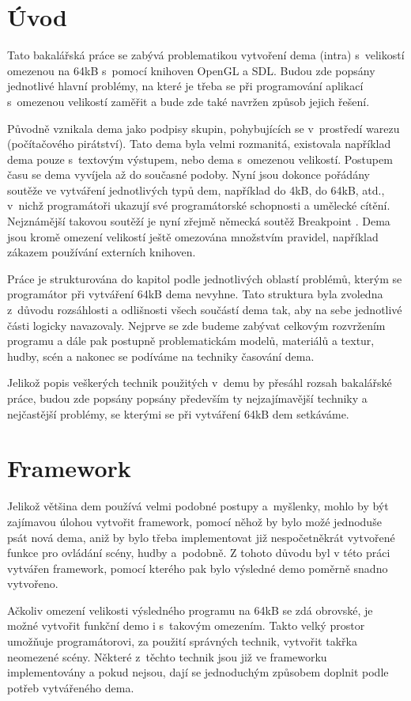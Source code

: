 \chapter{Úvod}
Tato bakalářská práce se zabývá problematikou vytvoření dema (intra) s~velikostí omezenou na 64kB s~pomocí knihoven OpenGL a SDL.
Budou zde popsány jednotlivé hlavní problémy, na které je třeba se při programování aplikací s~omezenou velikostí zaměřit a bude zde také navržen způsob jejich řešení.

Původně vznikala dema jako podpisy skupin, pohybujících se v~prostředí warezu (počítačového pirátství).
Tato dema byla velmi rozmanitá, existovala například dema pouze s~textovým výstupem, nebo dema s~omezenou velikostí.
Postupem času se dema vyvíjela až do současné podoby.
Nyní jsou dokonce pořádány soutěže ve vytváření jednotlivých typů dem, například do 4kB, do 64kB, atd., v~nichž programátoři ukazují své programátorské schopnosti a umělecké cítění.
Nejznámější takovou soutěží je nyní zřejmě německá soutěž Breakpoint \cite{breakpoint}.
Dema jsou kromě omezení velikostí ještě omezována množstvím pravidel, například zákazem používání externích knihoven.

Práce je strukturována do kapitol podle jednotlivých oblastí problémů, kterým se programátor při vytváření 64kB dema nevyhne.
Tato struktura byla zvoledna z~důvodu rozsáhlosti a odlišnosti všech součástí dema tak, aby na sebe jednotlivé části logicky navazovaly.
Nejprve se zde budeme zabývat celkovým rozvržením programu a dále pak postupně problematickám modelů, materiálů a textur, hudby, scén a nakonec se podíváme na techniky časování dema.

Jelikož popis veškerých technik použitých v~demu by přesáhl rozsah bakalářské práce, budou zde popsány popsány především ty nejzajímavější techniky a nejčastější problémy, se kterými se při vytváření 64kB dem setkáváme. 


\chapter{Framework}
Jelikož většina dem používá velmi podobné postupy a~myšlenky, mohlo by být zajímavou úlohou vytvořit framework, pomocí něhož by bylo možé jednoduše psát nová dema, aniž by bylo třeba implementovat již nespočetněkrát vytvořené funkce pro ovládání scény, hudby a~podobně.
Z tohoto důvodu byl v této práci vytvářen framework, pomocí kterého pak bylo výsledné demo poměrně snadno vytvořeno.

Ačkoliv omezení velikosti výsledného programu na 64kB se zdá obrovské, je možné vytvořit funkční demo i s~takovým omezením.
Takto velký prostor umožňuje programátorovi, za použití správných technik, vytvořit takřka neomezené scény.
Některé z~těchto technik jsou již ve frameworku implementovány a pokud nejsou, dají se jednoduchým způsobem doplnit podle potřeb vytvářeného dema.


